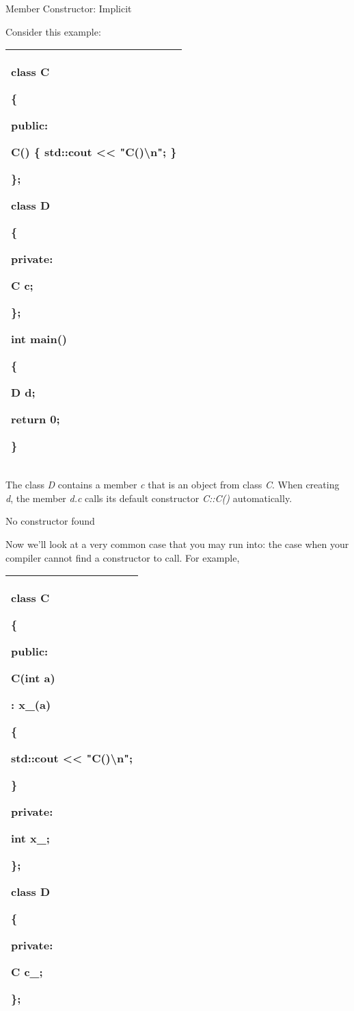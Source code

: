 \documentclass[
]{article}
\begin{document}
Member Constructor: Implicit

Consider this example:

\begin{longtable}[]{@{}l@{}}
\toprule
\endhead
\begin{minipage}[t]{0.97\columnwidth}\raggedright
class C

\{

public:

C() \{ std::cout \textless\textless{} "C()\textbackslash n"; \}

\};

class D

\{

private:

C c;

\};

int main()

\{

D d;

return 0;

\}\strut
\end{minipage}\tabularnewline
\bottomrule
\end{longtable}

The class \emph{D} contains a member \emph{c} that is an object from
class \emph{C}. When creating \emph{d}, the member \emph{d.c }calls its
default constructor \emph{C::C()} automatically.

No constructor found

Now we'll look at a very common case that you may run into: the case
when your compiler cannot find a constructor to call. For example,

\begin{longtable}[]{@{}l@{}}
\toprule
\endhead
\begin{minipage}[t]{0.97\columnwidth}\raggedright
class C

\{

public:

C(int a)

: x\_(a)

\{

std::cout \textless\textless{} "C()\textbackslash n";

\}

private:

int x\_;

\};

class D

\{

private:

C c\_;

\};\strut
\end{minipage}\tabularnewline
\bottomrule
\end{longtable}
\end{document}
